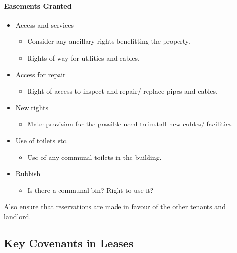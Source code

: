 \documentclass[
]{article}
\providecommand{\tightlist}{%
  \setlength{\itemsep}{0pt}\setlength{\parskip}{0pt}}
\begin{document}
\hypertarget{easements-granted}{%
\paragraph{Easements Granted}\label{easements-granted}}

\begin{itemize}
\tightlist
\item
  Access and services

  \begin{itemize}
  \tightlist
  \item
    Consider any ancillary rights benefitting the property.
  \item
    Rights of way for utilities and cables.
  \end{itemize}
\item
  Access for repair

  \begin{itemize}
  \tightlist
  \item
    Right of access to inspect and repair/ replace pipes and cables.
  \end{itemize}
\item
  New rights

  \begin{itemize}
  \tightlist
  \item
    Make provision for the possible need to install new cables/
    facilities.
  \end{itemize}
\item
  Use of toilets etc.

  \begin{itemize}
  \tightlist
  \item
    Use of any communal toilets in the building.
  \end{itemize}
\item
  Rubbish

  \begin{itemize}
  \tightlist
  \item
    Is there a communal bin? Right to use it?
  \end{itemize}
\end{itemize}

Also ensure that reservations are made in favour of the other tenants
and landlord.

\hypertarget{key-covenants-in-leases}{%
\subsection{Key Covenants in Leases}\label{key-covenants-in-leases}}
\end{document}
